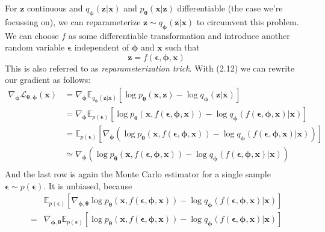 \documentclass[12pt]{report}
\begin{document}
For $\mathbf{z}$ continuous and $q_{\mathbf{\phi}}(\mathbf{z}|\mathbf{x})$ and $p_{\mathbf{\theta}}(\mathbf{x}|\mathbf{z})$ differentiable (the case we're focussing on), we can reparameterize $\mathbf{z} \sim q_{\mathbf{\phi}}(\mathbf{z}|\mathbf{x})$ to circumvent this problem. We can choose $f$ as some differentiable transformation and introduce another random variable $\pmb{\epsilon}$ independent of $\pmb{\phi}$ and $\mathbf{x}$ such that
\begin{equation}
\mathbf{z} = f(\pmb{\epsilon}, \pmb{\phi}, \mathbf{x})
\end{equation}
This is also referred to as \emph{reparameterization trick}. With (2.12) we can rewrite our gradient as follows:
\begin{equation}
\begin{split}
\nabla_{\pmb{\phi}}\mathcal{L}_{\pmb{\theta}, \pmb{\phi}}(\mathbf{x}) 
& = \nabla_{\pmb{\phi}} \mathbb{E}_{q_{\mathbf{\phi}}(\mathbf{z}|\mathbf{x})}\left[ \log p_{\mathbf{\theta}}(\mathbf{x}, \mathbf{z}) - \log q_{\mathbf{\phi}}(\mathbf{z}|\mathbf{x}) \right]	\\
& = \nabla_{\pmb{\phi}} \mathbb{E}_{p(\pmb{\epsilon})}\left[ \log p_{\mathbf{\theta}}(\mathbf{x}, f(\pmb{\epsilon}, \pmb{\phi}, \mathbf{x})) - \log q_{\mathbf{\phi}}(f(\pmb{\epsilon}, \pmb{\phi}, \mathbf{x})|\mathbf{x}) \right]	\\
& = \mathbb{E}_{p(\pmb{\epsilon})}\left[ \nabla_{\pmb{\phi}}(\log p_{\mathbf{\theta}}(\mathbf{x}, f(\pmb{\epsilon}, \pmb{\phi}, \mathbf{x})) - \log q_{\mathbf{\phi}}(f(\pmb{\epsilon}, \pmb{\phi}, \mathbf{x})|\mathbf{x})) \right]	\\
& \simeq \nabla_{\pmb{\phi}}(\log p_{\mathbf{\theta}}(\mathbf{x}, f(\pmb{\epsilon}, \pmb{\phi}, \mathbf{x})) - \log q_{\mathbf{\phi}}(f(\pmb{\epsilon}, \pmb{\phi}, \mathbf{x})|\mathbf{x})) \\
\end{split}
\end{equation}
And the last row is again the Monte Carlo estimator for a single sample $\pmb{\epsilon} \sim p(\pmb{\epsilon})$. It is unbiased, because
\begin{equation}
\begin{split}
& \mathbb{E}_{p(\pmb{\epsilon})}\left[ \nabla_{\pmb{\phi}, \pmb{\theta}} \log p_{\mathbf{\theta}}(\mathbf{x}, f(\pmb{\epsilon}, \pmb{\phi}, \mathbf{x})) - \log q_{\mathbf{\phi}}(f(\pmb{\epsilon}, \pmb{\phi}, \mathbf{x})|\mathbf{x}) \right] \\
= & \nabla_{\pmb{\phi}, \pmb{\theta}} \mathbb{E}_{p(\pmb{\epsilon})}\left[  \log p_{\mathbf{\theta}}(\mathbf{x}, f(\pmb{\epsilon}, \pmb{\phi}, \mathbf{x})) - \log q_{\mathbf{\phi}}(f(\pmb{\epsilon}, \pmb{\phi}, \mathbf{x})|\mathbf{x}) \right] \\
\end{split}
\end{equation}
\end{document}
